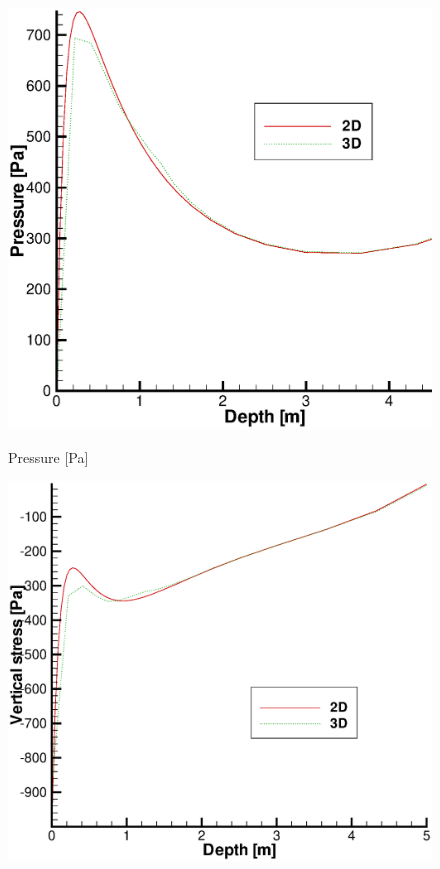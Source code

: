 \begin{figure}[H]
  \begin{center}
   \begin{minipage}[t]{0.40\textwidth}
     \begin{center}
    \includegraphics[scale=0.25]{HM/HM3D/pre_line.eps}
    \centerline{Pressure [Pa]}
    \end{center}
   \end{minipage}
   \begin{minipage}[t]{0.4\textwidth}
    \begin{center}
    \includegraphics[scale=0.25]{HM/HM3D/stress_yy_line.eps}\\

\end{center}
\end{minipage}
\end{center}
\end{figure}
